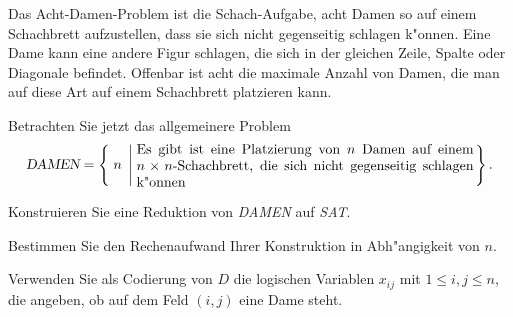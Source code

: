 Das Acht-Damen-Problem ist die Schach-Aufgabe, acht Damen so auf einem
Schachbrett aufzustellen, dass sie sich nicht gegenseitig schlagen k"onnen.
Eine Dame kann eine andere Figur schlagen, die sich in der gleichen Zeile,
Spalte oder Diagonale befindet.
Offenbar ist acht die maximale Anzahl von Damen, die man auf diese Art auf
einem Schachbrett platzieren kann.

Betrachten Sie jetzt das allgemeinere Problem
\[
\textsl{DAMEN}
=
\left\{\; n
\;\left|\;
\begin{minipage}{0.7\hsize}
Es gibt ist eine Platzierung von $n$ Damen auf einem $n\times n$-Schachbrett,
die sich nicht gegenseitig schlagen k"onnen
\end{minipage}\right.\right\}.
\]
\begin{teilaufgaben}
\item
Konstruieren Sie eine Reduktion von \textsl{DAMEN} auf \textsl{SAT}.
\item
Bestimmen Sie den Rechenaufwand Ihrer Konstruktion in Abh"angigkeit von $n$.
\end{teilaufgaben}

\begin{hinweis}
Verwenden Sie als Codierung von $D$ die logischen Variablen $x_{ij}$
mit $1\le i,j\le n$, die angeben, ob auf dem Feld $(i,j)$ eine Dame
steht.
\end{hinweis}

